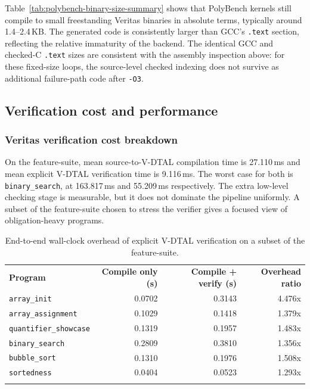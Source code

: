 Table~\ref{tab:polybench-binary-size-summary} shows that PolyBench kernels still compile to small freestanding Veritas binaries in absolute terms, typically around 1.4--2.4\,KB. The generated code is consistently larger than GCC's \texttt{.text} section, reflecting the relative immaturity of the backend. The identical GCC and checked-C \texttt{.text} sizes are consistent with the assembly inspection above: for these fixed-size loops, the source-level checked indexing does not survive as additional failure-path code after \texttt{-O3}.

\subsection{Verification cost and performance}\label{sec:verification-perf}

\subsubsection{Veritas verification cost breakdown}

On the feature-suite, mean source-to-V-DTAL compilation time is 27.110\,ms and mean explicit V-DTAL verification time is 9.116\,ms. The worst case for both is \texttt{binary\_search}, at 163.817\,ms and 55.209\,ms respectively. The extra low-level checking stage is measurable, but it does not dominate the pipeline uniformly. A subset of the feature-suite chosen to stress the verifier gives a focused view of obligation-heavy programs.

\begin{table}[h]
  \centering
  \small
  \begin{tabular}{l r r r}
    \tablehline
    \textbf{Program}              & \textbf{Compile only (s)} & \textbf{Compile + verify (s)} & \textbf{Overhead ratio} \\
    \tablehline
    \texttt{array\_init}          & 0.0702                    & 0.3143                        & 4.476x                  \\
    \texttt{array\_assignment}    & 0.1029                    & 0.1418                        & 1.379x                  \\
    \texttt{quantifier\_showcase} & 0.1319                    & 0.1957                        & 1.483x                  \\
    \texttt{binary\_search}       & 0.2809                    & 0.3810                        & 1.356x                  \\
    \texttt{bubble\_sort}         & 0.1310                    & 0.1976                        & 1.508x                  \\
    \texttt{sortedness}           & 0.0404                    & 0.0523                        & 1.293x                  \\
    \tablehline
  \end{tabular}
  \caption{End-to-end wall-clock overhead of explicit V-DTAL verification on a subset of the feature-suite.}
  \label{tab:verification-stress-overheads}
\end{table}

